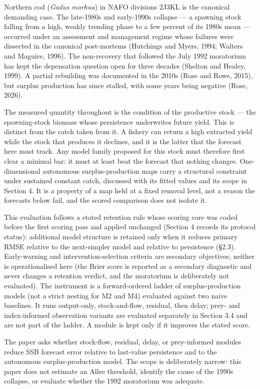 \documentclass[11pt]{article}
\begin{document}
Northern cod (\emph{Gadus morhua}) in NAFO divisions 2J3KL is the
canonical demanding case. The late-1980s and early-1990s collapse --- a
spawning stock falling from a high, weakly trending phase to a few
percent of its 1980s mean --- occurred under an assessment and
management regime whose failures were dissected in the canonical
post-mortems (Hutchings and Myers, 1994; Walters and Maguire, 1996). The
non-recovery that followed the July 1992 moratorium has kept the
depensation question open for three decades (Shelton and Healey, 1999).
A partial rebuilding was documented in the 2010s (Rose and Rowe, 2015),
but surplus production has since stalled, with some years being negative
(Rose, 2026).

The measured quantity throughout is the condition of the productive
stock --- the spawning-stock biomass whose persistence underwrites
future yield. This is distinct from the catch taken from it. A fishery
can return a high extracted yield while the stock that produces it
declines, and it is the latter that the forecast here must track. Any
model family proposed for this stock must therefore first clear a
minimal bar: it must at least beat the forecast that nothing changes.
One-dimensional autonomous surplus-production maps carry a structural
constraint under sustained constant catch, discussed with its fitted
values and its scope in Section 4. It is a property of a map held at a
fixed removal level, not a reason the forecasts below fail, and the
scored comparison does not isolate it.

This evaluation follows a stated retention rule whose scoring core was
coded before the first scoring pass and applied unchanged (Section 4 records its protocol
status): additional model structure is retained only when it reduces
primary RMSE relative to the next-simpler model and relative to
persistence (\S{}2.3). Early-warning and intervention-selection criteria
are secondary objectives; neither is operationalised here (the
Brier score is reported as a secondary diagnostic and never changes a
retention verdict, and the moratorium is deliberately not evaluated).
The instrument is a forward-ordered ladder of surplus-production models
(not a strict nesting for M2 and M4) evaluated against two naive
baselines. It runs output-only, stock-and-flow, residual, then delay;
prey- and index-informed observation variants are evaluated separately
in Section 3.4 and are not part of the ladder. A module is kept only if
it improves the stated score.

The paper asks whether stock-flow, residual, delay, or prey-informed
modules reduce SSB forecast error relative to last-value persistence and
to the autonomous surplus-production model. The scope is deliberately
narrow: this paper does not estimate an Allee threshold, identify the
cause of the 1990s collapse, or evaluate whether the 1992 moratorium was
adequate.
\end{document}
